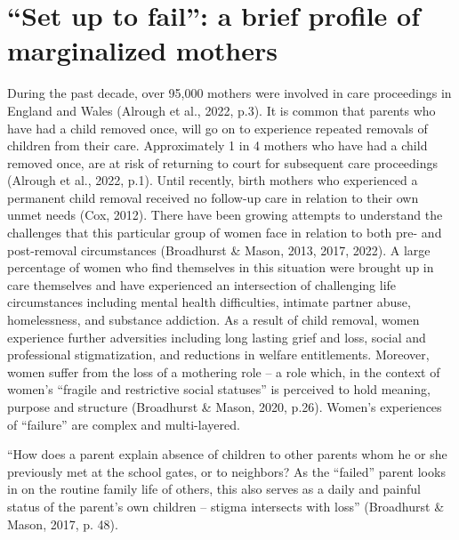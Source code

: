 \documentclass[authordate, empirical]{jote-new-article}
\author[1]{\mbox{Afra Jurkiewicz\orcid{0009-0004-6138-8392}}}
\affil[1]{Nordoff Robbins}
\begin{document}
\begin{frontmatter}
  \maketitle
  \begin{abstract}
    \printabstracttext
  \end{abstract}
\end{frontmatter}


	\section{“Set up to fail”: a brief profile of marginalized mothers}







	During the past decade, over 95,000 mothers were involved in care proceedings in England and Wales (Alrough et al., 2022, p.3). It is common that parents who have had a child removed once, will go on to experience repeated removals of children from their care. Approximately 1 in 4 mothers who have had a child removed once, are at risk of returning to court for subsequent care proceedings (Alrough et al., 2022, p.1). Until recently, birth mothers who experienced a permanent child removal received no follow-up care in relation to their own unmet needs (Cox, 2012). There have been growing attempts to understand the challenges that this particular group of women face in relation to both pre- and post-removal circumstances (Broadhurst \& Mason, 2013, 2017, 2022). A large percentage of women who find themselves in this situation were brought up in care themselves and have experienced an intersection of challenging life circumstances including mental health difficulties, intimate partner abuse, homelessness, and substance addiction. As a result of child removal, women experience further adversities including long lasting grief and loss, social and professional stigmatization, and reductions in welfare entitlements. Moreover, women suffer from the loss of a mothering role -- a role which, in the context of women's “fragile and restrictive social statuses” is perceived to hold meaning, purpose and structure (Broadhurst \& Mason, 2020, p.26). Women's experiences of “failure” are complex and multi-layered.







	“How does a parent explain absence of children to other parents whom he or she previously met at the school gates, or to neighbors? As the “failed” parent looks in on the routine family life of others, this also serves as a daily and painful status of the parent's own children -- stigma intersects with loss” (Broadhurst \& Mason, 2017, p. 48).
\end{document}
